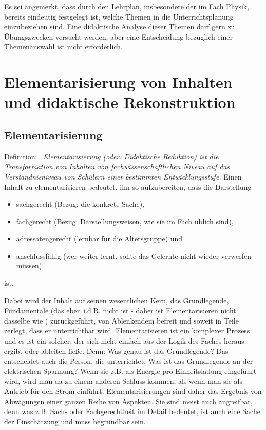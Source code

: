 \bip

Es sei angemerkt, dass durch den Lehrplan, insbesondere der im Fach Physik, bereits eindeutig festgelegt ist, welche Themen in die Unterrichtsplanung einzubeziehen sind. Eine didaktische Analyse dieser Themen darf gern zu \"{U}bungszwecken versucht werden, aber eine Entscheidung bez\"{u}glich einer Themenauswahl ist nicht erforderlich.

\bip\bip
\section{Elementarisierung von Inhalten und didaktische Rekonstruktion}\label{Elementarisierung}

\subsection{Elementarisierung}\label{Elementarisierung}

Definition:~ \emph{Elementarisierung (oder: Didaktische Reduktion) ist die Transformation von Inhalten von fachwissenschaftlichen Niveau auf das Verst\"{a}ndnisniveau von Sch\"{u}lern einer bestimmten Entwicklungsstufe.}
\bip
Einen Inhalt zu elementarisieren bedeutet, ihn so aufzubereiten, dass die Darstellung
\begin{itemize}
\item {sachgerecht (Bezug: die konkrete Sache),}
\item{ fachgerecht (Bezug: Darstellungsweisen, wie sie im Fach \"{u}blich sind),}
\item{ adressatengerecht (lernbar f\"{u}r die Altersgruppe) und }
\item{ anschlussf\"{a}hig (wer weiter lernt, sollte das Gelernte nicht wieder verwerfen m\"{u}ssen)}
\end{itemize}
ist.
\bip

Dabei wird der Inhalt auf seinen wesentlichen Kern, das Grundlegende, Fundamentale (das eben i.d.R. nicht  ist - daher ist Elementarisieren nicht dasselbe wie ) zur\"{u}ckgef\"{u}hrt, von Ablenkendem befreit und soweit in Teile zerlegt, dass er unterrichtbar wird.
\mip
Elementarisieren ist ein komplexer Prozess und es ist ein solcher, der sich nicht einfach aus der Logik des Faches heraus ergibt oder ableiten lie{\ss}e. Denn: Was genau ist das Grundlegende? Das entscheidet auch die Person, die unterrichtet. Was ist das Grundlegende an der elektrischen Spannung? Wenn sie z.B. als Energie pro Einheitsladung eingef\"{u}hrt wird, wird man da zu einem anderen Schluss kommen, als wenn man sie als {\glqq}Antrieb{\grqq} f\"{u}r den Strom einf\"{u}hrt.
Elementarisierungen sind daher das Ergebnis von Abw\"{a}gungen einer ganzen Reihe von Aspekten. Sie sind meist auch angreifbar, denn was z.B. Sach- oder Fachgerechtheit im Detail bedeutet, ist auch eine Sache der Einsch\"{a}tzung und muss begr\"{u}ndbar sein.


